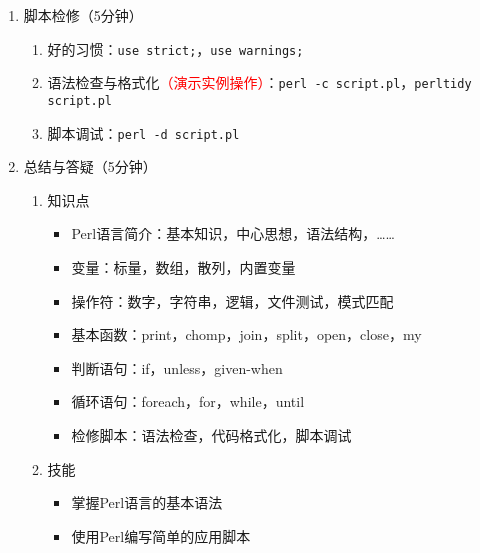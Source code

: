 \documentclass{TIJMUjiaoanLL}
\begin{document}
\begin{enumerate}
  \item 脚本检修（5分钟）
    \begin{enumerate}
      \item 好的习惯：\verb|use strict;|，\verb|use warnings;|
      \item 语法检查与格式化\textcolor{red}{（演示实例操作）}：\verb|perl -c script.pl|，\verb|perltidy script.pl|
      \item 脚本调试：\verb|perl -d script.pl|
    \end{enumerate}
  \item 总结与答疑（5分钟）
    \begin{enumerate}
      \item 知识点
	\begin{itemize}
	  \item Perl语言简介：基本知识，中心思想，语法结构，……
	  \item 变量：标量，数组，散列，内置变量
	  \item 操作符：数字，字符串，逻辑，文件测试，模式匹配
	  \item 基本函数：print，chomp，join，split，open，close，my
	  \item 判断语句：if，unless，given-when
	  \item 循环语句：foreach，for，while，until
	  \item 检修脚本：语法检查，代码格式化，脚本调试
	\end{itemize}
      \item 技能
	\begin{itemize}
	  \item 掌握Perl语言的基本语法
	  \item 使用Perl编写简单的应用脚本
	\end{itemize}
    \end{enumerate}
\end{enumerate}

\otherTail
\end{document}
